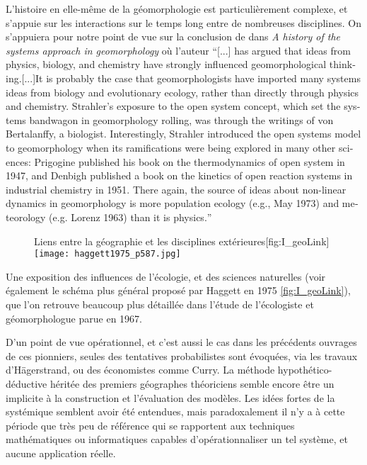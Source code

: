 L'histoire en elle-même de la géomorphologie est particulièrement complexe, et s'appuie sur les interactions sur le temps long entre de nombreuses disciplines. On s'appuiera pour notre point de vue sur la conclusion de \textcite{Huggett2007} dans \textit{A history of the systems approach in geomorphology} où l'auteur \foreignquote{english}{[...] has argued that ideas from physics, biology, and chemistry have strongly influenced geomorphological thinking.[...]It is probably the case that geomorphologists have imported many systems ideas from biology and evolutionary ecology, rather than directly through physics and chemistry. Strahler’s exposure to the open system concept, which set the systems bandwagon in geomorphology rolling, was through the writings of von Bertalanffy, a biologist. Interestingly, Strahler introduced the open systems model to geomorphology when its ramifications were being explored in many other sciences: Prigogine published his book on the thermodynamics of open system in 1947, and Denbigh published a book on the kinetics of open reaction systems in industrial chemistry in 1951. There again, the source of ideas about non-linear dynamics in geomorphology is more population ecology (e.g., May 1973) and meteorology (e.g. Lorenz 1963) than it is physics.}

  \begin{figure}[htbp]
  \begin{sidecaption}[fortoc]{Liens entre la géographie et les disciplines extérieures}[fig:I_geoLink]
    \centering
   \texttt{[image: haggett1975\_p587.jpg]}
    \end{sidecaption}
  \end{figure}

Une exposition des influences de l'écologie, et des sciences naturelles (voir également le schéma plus général proposé par Haggett en 1975 \ref{fig:I_geoLink}), que l'on retrouve beaucoup plus détaillée dans l'étude de l'écologiste et géomorphologue \textcite{Stoddart1967} parue en 1967.

D'un point de vue opérationnel, et c'est aussi le cas dans les précédents ouvrages de ces pionniers, seules des tentatives probabilistes sont évoquées, via les travaux d'Hägerstrand, ou des économistes comme Curry. La méthode hypothético-déductive héritée des premiers géographes théoriciens semble encore être un implicite à la construction et l'évaluation des modèles. Les idées fortes de la systémique semblent avoir été entendues, mais paradoxalement il n'y a à cette période que très peu de référence qui se rapportent aux techniques mathématiques ou informatiques capables d’opérationnaliser un tel système, et aucune application réelle. \autocite[467-468]{Harvey1969}


